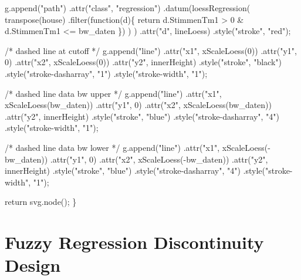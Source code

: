 \documentclass[
  letterpaper,
  DIV=11,
  oneside]{scrreprt}
\newenvironment{Shaded}{\begin{snugshade}}{\end{snugshade}}
\newcommand{\NormalTok}[1]{\textcolor[rgb]{0.00,0.23,0.31}{#1}}
\begin{document}
\begin{Shaded}
\begin{Highlighting}[]
\NormalTok{  g.append("path")}
\NormalTok{      .attr("class", "regression")}
\NormalTok{      .datum(loessRegression(}
\NormalTok{        transpose(house)}
\NormalTok{          .filter(function(d)\{ return d.StimmenTm1 \textgreater{} 0 \& d.StimmenTm1 \textless{}= bw\_daten \})}
\NormalTok{          )}
\NormalTok{        )}
\NormalTok{      .attr("d", lineLoess)}
\NormalTok{      .style("stroke", "red");}
  
\NormalTok{  /* dashed line at cutoff */}
\NormalTok{  g.append("line")}
\NormalTok{  .attr("x1", xScaleLoess(0))}
\NormalTok{  .attr("y1", 0)}
\NormalTok{  .attr("x2", xScaleLoess(0))}
\NormalTok{  .attr("y2", innerHeight)}
\NormalTok{  .style("stroke", "black")}
\NormalTok{  .style("stroke{-}dasharray", "1")}
\NormalTok{  .style("stroke{-}width", "1");}
  
\NormalTok{  /* dashed line data bw upper */}
\NormalTok{  g.append("line")}
\NormalTok{  .attr("x1", xScaleLoess(bw\_daten))}
\NormalTok{  .attr("y1", 0)}
\NormalTok{  .attr("x2", xScaleLoess(bw\_daten))}
\NormalTok{  .attr("y2", innerHeight)}
\NormalTok{  .style("stroke", "blue")}
\NormalTok{  .style("stroke{-}dasharray", "4")}
\NormalTok{  .style("stroke{-}width", "1");}
  
\NormalTok{  /* dashed line data bw lower */}
\NormalTok{  g.append("line")}
\NormalTok{  .attr("x1", xScaleLoess({-}bw\_daten))}
\NormalTok{  .attr("y1", 0)}
\NormalTok{  .attr("x2", xScaleLoess({-}bw\_daten))}
\NormalTok{  .attr("y2", innerHeight)}
\NormalTok{  .style("stroke", "blue")}
\NormalTok{  .style("stroke{-}dasharray", "4")}
\NormalTok{  .style("stroke{-}width", "1");}

\NormalTok{  return svg.node();}
\NormalTok{\}}
\end{Highlighting}
\end{Shaded}

\hypertarget{fuzzy-regression-discontinuity-design}{%
\section{Fuzzy Regression Discontinuity
Design}\label{fuzzy-regression-discontinuity-design}}
\end{document}
